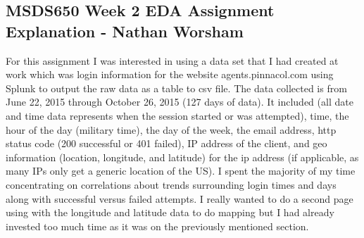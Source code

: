 \documentclass[10pt]{article}
\begin{document}
\subsection*{MSDS650 Week 2 EDA Assignment Explanation - Nathan Worsham}
For this assignment I was interested in using a data set that I had created at work which was login information for the website agents.pinnacol.com using Splunk to output the raw data as a table to csv file.
The data collected is from June 22, 2015 through October 26, 2015 (127 days of data). It included (all date and time data represents when the session started or was attempted), time, the hour of the day (military time), the day of the week, the email address, http status code (200 successful or 401 failed), IP address of the client, and geo information (location, longitude, and latitude) for the ip address (if applicable, as many IPs only get a generic location of the US). I spent the majority of my time concentrating on correlations about trends surrounding login times and days along with successful versus failed attempts. I really wanted to do a second page using with the longitude and latitude data to do mapping but I had already invested too much time as it was on the previously mentioned section. 
\end{document}
